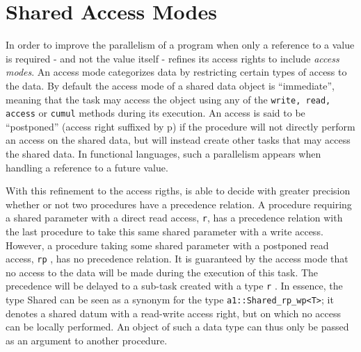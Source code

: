 

\newpage
\section{Shared Access Modes}\label{sec:shd_modes}
In order to improve the parallelism of a program when only a reference to a value is required - and not 
the value itself - \kaapi  refines its access rights to include \textit{access modes}.  An access mode categorizes 
data by restricting certain types of access to the data.  By default the access mode of a shared data object 
is ``immediate'', meaning that the task may access the object using any of the {\tt write, read, access} or {\tt cumul} 
methods during its execution.  An access is said to be ``postponed'' (access right suffixed by p) if the 
procedure will not directly perform an access on the shared data, but will instead create other tasks that 
may access the shared data.  In functional languages, such a parallelism appears when handling a reference 
to a future value. 

With this refinement to the access rigths, \kaapi  is able to decide with greater precision whether or not 
two procedures have a precedence relation.  A procedure requiring a shared parameter with a direct read access,
\texttt{r}, has a precedence relation with the last procedure to take this same shared parameter with a write access.  
However, a procedure taking some shared parameter with a postponed read access, \texttt{rp} , has no precedence relation.  
It is guaranteed by the access mode that no access to the data will be made during the execution of this task.  
The precedence will be delayed to a sub-task created with a type \texttt{r} . In essence, the type Shared can be seen as 
a synonym for the type \verb!a1::Shared_rp_wp<T>!; it denotes a shared datum with a read-write access right, but on 
which no access can be locally performed. An object of such a data type can thus only be passed as an argument 
to another procedure. 


